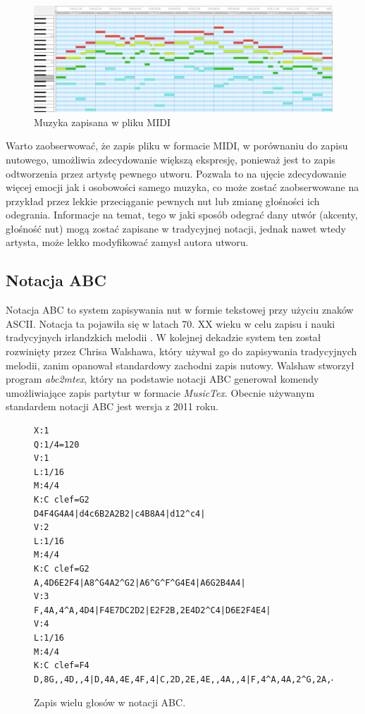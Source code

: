 \documentclass[data-science]{agh-wi} %
\begin{document}
\begin{figure}[ht!]
    \begin{center}
        \includegraphics*[width=\linewidth]{./img/piano_roll.png}
    \end{center}
    \caption{Muzyka zapisana w pliku MIDI}\label{fig:jsb_pianoroll}
\end{figure}

Warto zaobserwować, że zapis pliku w formacie MIDI, w porównaniu do zapisu nutowego, umożliwia zdecydowanie większą ekspresję, ponieważ jest to zapis odtworzenia przez artystę pewnego utworu. Pozwala to na ujęcie zdecydowanie więcej emocji jak i osobowości samego muzyka, co może zostać zaobserwowane na przykład przez lekkie przeciąganie pewnych nut lub zmianę głośności ich odegrania. Informacje na temat, tego w jaki sposób odegrać dany utwór (akcenty, głośność nut) mogą zostać zapisane w tradycyjnej notacji, jednak nawet wtedy artysta, może lekko modyfikować zamysł autora utworu.

\subsection{Notacja ABC}
Notacja ABC to system zapisywania nut w formie tekstowej przy użyciu znaków ASCII. Notacja ta pojawiła się w latach 70. XX wieku w celu zapisu i nauki tradycyjnych irlandzkich melodii \cite{abc_history}. W kolejnej dekadzie system ten został rozwinięty przez Chrisa Walshawa, który używał go do zapisywania tradycyjnych melodii, zanim opanował standardowy zachodni zapis nutowy. Walshaw stworzył program \textit{abc2mtex}, który na podstawie notacji ABC generował komendy umożliwiające zapis partytur w formacie \textit{MusicTex}. Obecnie używanym standardem notacji ABC jest wersja z 2011 roku.

\begin{figure}[ht!]
    \begin{verbatim}
X:1
Q:1/4=120
V:1
L:1/16
M:4/4
K:C clef=G2
D4F4G4A4|d4c6B2A2B2|c4B8A4|d12^c4|
V:2
L:1/16
M:4/4
K:C clef=G2
A,4D6E2F4|A8^G4A2^G2|A6^G^F^G4E4|A6G2B4A4|
V:3
F,4A,4^A,4D4|F4E7DC2D2|E2F2B,2E4D2^C4|D6E2F4E4|
V:4
L:1/16
M:4/4
K:C clef=F4
D,8G,,4D,,4|D,4A,4E,4F,4|C,2D,2E,4E,,4A,,4|F,4^A,4A,2^G,2A,4|        
\end{verbatim}
    \caption{Zapis wielu głosów w notacji ABC.}\label{fig:abc_polyphony}
\end{figure}
\end{document}
